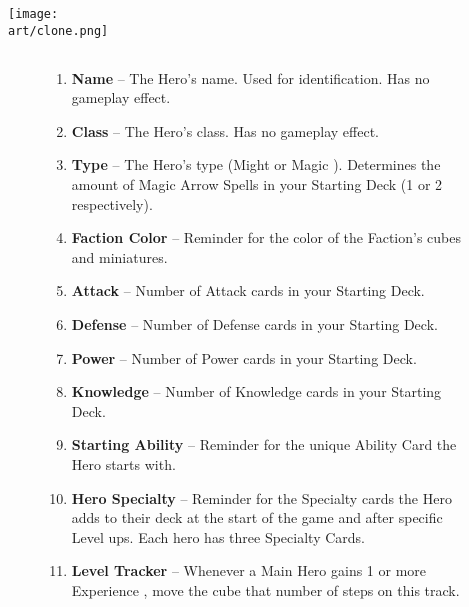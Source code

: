 \begin{multicols*}{2}
\vfill

\hspace{2em}
\texttt{[image: \\art/clone.png]}

\end{multicols*}

\clearpage

\subsection*{}
\bigbreak
\begin{figure}[h]
  \begin{minipage}[t]{0.5\textwidth}
    \vspace{0pt}
    \begin{enumerate}[itemsep=5pt]
      \item \textbf{Name} – The Hero's name.
        Used for identification.
        Has no gameplay effect.
      \item \textbf{Class} – The Hero's class.
        Has no gameplay effect.
      \item \textbf{Type} – The Hero's type (Might  or Magic ).
        Determines the amount of Magic Arrow Spells in your Starting Deck (1 or 2 respectively).
      \item \textbf{Faction Color} – Reminder for the color of the Faction's cubes and miniatures.
      \item \textbf{Attack} – Number of Attack cards in your Starting Deck.
      \item \textbf{Defense} – Number of Defense cards in your Starting Deck.
      \item \textbf{Power} – Number of Power cards in your Starting Deck.
      \item \textbf{Knowledge} – Number of Knowledge cards in your Starting Deck.
      \item \textbf{Starting Ability} – Reminder for the unique Ability Card the Hero starts with.
      \item \textbf{Hero Specialty} – Reminder for the Specialty cards the Hero adds to their deck at the start of the game and after specific Level ups.
        Each hero has three Specialty Cards.
      \item \textbf{Level Tracker} – Whenever a Main Hero gains 1 or more Experience , move the cube that number of steps on this track.

\end{enumerate}
\end{minipage}
\end{figure}
